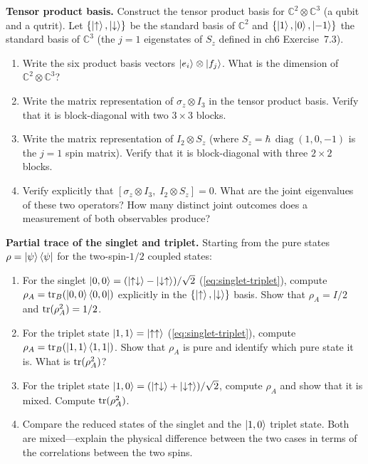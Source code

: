 \begin{problemset}

\item[Exercise 7.1] \textbf{Tensor product basis.}
\label{item:ex-tensor-basis}
Construct the tensor product basis for $\mathbb{C}^2 \otimes \mathbb{C}^3$ (a qubit and a qutrit). Let $\{\ket{\uparrow}, \ket{\downarrow}\}$ be the standard basis of $\mathbb{C}^2$ and $\{\ket{1}, \ket{0}, \ket{-1}\}$ the standard basis of $\mathbb{C}^3$ (the $j=1$ eigenstates of $S_z$ defined in ch6 Exercise~7.3).

\begin{enumerate}
\item[(a)] Write the six product basis vectors $\ket{e_i} \otimes \ket{f_j}$. What is the dimension of $\mathbb{C}^2 \otimes \mathbb{C}^3$?
\item[(b)] Write the matrix representation of $\sigma_z \otimes I_3$ in the tensor product basis. Verify that it is block-diagonal with two $3\times3$ blocks.
\item[(c)] Write the matrix representation of $I_2 \otimes S_z$ (where $S_z = \hbar\,\operatorname{diag}(1,0,-1)$ is the $j=1$ spin matrix). Verify that it is block-diagonal with three $2\times2$ blocks.
\item[(d)] Verify explicitly that $[\sigma_z \otimes I_3,\; I_2 \otimes S_z] = 0$. What are the joint eigenvalues of these two operators? How many distinct joint outcomes does a measurement of both observables produce?
\end{enumerate}

\item[Exercise 7.2] \textbf{Partial trace of the singlet and triplet.}
\label{item:ex-partial-trace}
Starting from the pure states $\rho = \ket{\psi}\bra{\psi}$ for the two-spin-$1/2$ coupled states:

\begin{enumerate}
\item[(a)] For the singlet $\ket{0,0} = (\ket{\uparrow\downarrow} - \ket{\downarrow\uparrow})/\sqrt{2}$ (\eqref{eq:singlet-triplet}), compute $\rho_A = \mathrm{tr}_B(\ket{0,0}\bra{0,0})$ explicitly in the $\{\ket{\uparrow}, \ket{\downarrow}\}$ basis. Show that $\rho_A = I/2$ and $\mathrm{tr}(\rho_A^2) = 1/2$.
\item[(b)] For the triplet state $\ket{1,1} = \ket{\uparrow\uparrow}$ (\eqref{eq:singlet-triplet}), compute $\rho_A = \mathrm{tr}_B(\ket{1,1}\bra{1,1})$. Show that $\rho_A$ is pure and identify which pure state it is. What is $\mathrm{tr}(\rho_A^2)$?
\item[(c)] For the triplet state $\ket{1,0} = (\ket{\uparrow\downarrow} + \ket{\downarrow\uparrow})/\sqrt{2}$, compute $\rho_A$ and show that it is mixed. Compute $\mathrm{tr}(\rho_A^2)$.
\item[(d)] Compare the reduced states of the singlet and the $\ket{1,0}$ triplet state. Both are mixed---explain the physical difference between the two cases in terms of the correlations between the two spins.
\end{enumerate}


\end{problemset}
